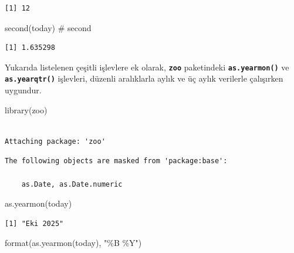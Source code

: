 \documentclass[
  letterpaper,
  DIV=11,
  numbers=noendperiod]{scrreprt}
\newenvironment{Shaded}{\begin{snugshade}}{\end{snugshade}}
\newcommand{\CommentTok}[1]{\textcolor[rgb]{0.37,0.37,0.37}{#1}}
\newcommand{\FunctionTok}[1]{\textcolor[rgb]{0.28,0.35,0.67}{#1}}
\newcommand{\NormalTok}[1]{\textcolor[rgb]{0.00,0.23,0.31}{#1}}
\newcommand{\StringTok}[1]{\textcolor[rgb]{0.13,0.47,0.30}{#1}}
\begin{document}
\begin{verbatim}
[1] 12
\end{verbatim}

\begin{Shaded}
\begin{Highlighting}[]
\FunctionTok{second}\NormalTok{(today) }\CommentTok{\# second}
\end{Highlighting}
\end{Shaded}

\begin{verbatim}
[1] 1.635298
\end{verbatim}

Yukarıda listelenen çeşitli işlevlere ek olarak, \textbf{\texttt{zoo}}
paketindeki \textbf{\texttt{as.yearmon()}} ve
\textbf{\texttt{as.yearqtr()}} işlevleri, düzenli aralıklarla aylık ve
üç aylık verilerle çalışırken uygundur.

\begin{Shaded}
\begin{Highlighting}[]
\FunctionTok{library}\NormalTok{(zoo)}
\end{Highlighting}
\end{Shaded}

\begin{verbatim}

Attaching package: 'zoo'
\end{verbatim}

\begin{verbatim}
The following objects are masked from 'package:base':

    as.Date, as.Date.numeric
\end{verbatim}

\begin{Shaded}
\begin{Highlighting}[]
\FunctionTok{as.yearmon}\NormalTok{(today)}
\end{Highlighting}
\end{Shaded}

\begin{verbatim}
[1] "Eki 2025"
\end{verbatim}

\begin{Shaded}
\begin{Highlighting}[]
\FunctionTok{format}\NormalTok{(}\FunctionTok{as.yearmon}\NormalTok{(today), }\StringTok{"\%B \%Y"}\NormalTok{)}
\end{Highlighting}
\end{Shaded}
\end{document}
